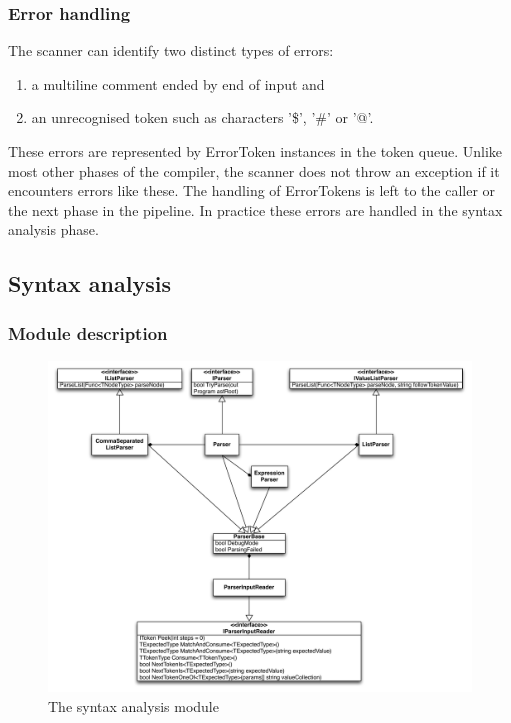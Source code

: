 \documentclass[a4paper,11pt]{article}
\begin{document}
\subsubsection{Error handling}

The scanner can identify two distinct types of errors:
\begin{enumerate}
\item a multiline comment ended by end of input and
\item an unrecognised token such as characters '\$', '\#' or '@'.
\end{enumerate}

These errors are represented by ErrorToken instances in the token queue. Unlike most other phases of the compiler, the scanner does not throw an exception if it encounters errors like these. The handling of ErrorTokens is left to the caller or the next phase in the pipeline. In practice these errors are handled in the syntax analysis phase.

\subsection{Syntax analysis}

\subsubsection{Module description}

\begin{figure}[h!]
\centering
\includegraphics[width=1.0\textwidth]{syntax_analysis.pdf}
\caption{The syntax analysis module}
\end{figure}
\end{document}
